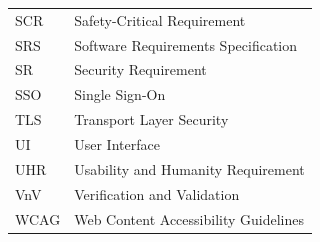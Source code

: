 \documentclass[12pt, titlepage]{article}
\begin{document}
\begin{table}[H]
\begin{tabular}{|l|l|}
    SCR & Safety-Critical Requirement \\
    SRS & Software Requirements Specification \\
    SR & Security Requirement \\
    SSO & Single Sign-On \\
    TLS & Transport Layer Security \\
    UI & User Interface \\
    UHR & Usability and Humanity Requirement \\
    VnV & Verification and Validation \\
    WCAG & Web Content Accessibility Guidelines \\
    \hline
  \end{tabular}
\end{table}
\end{document}
